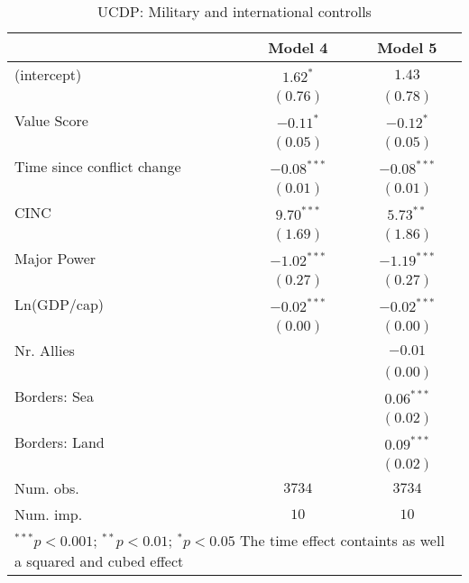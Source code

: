 
\begin{table}
\begin{center}
\begin{tabular}{l c c}
\toprule
 & Model 4 & Model 5 \\
\midrule
(intercept)                & $1.62^{*}$    & $1.43$        \\
                           & $(0.76)$      & $(0.78)$      \\
Value Score                & $-0.11^{*}$   & $-0.12^{*}$   \\
                           & $(0.05)$      & $(0.05)$      \\
Time since conflict change & $-0.08^{***}$ & $-0.08^{***}$ \\
                           & $(0.01)$      & $(0.01)$      \\
CINC                       & $9.70^{***}$  & $5.73^{**}$   \\
                           & $(1.69)$      & $(1.86)$      \\
Major Power                & $-1.02^{***}$ & $-1.19^{***}$ \\
                           & $(0.27)$      & $(0.27)$      \\
Ln(GDP/cap)                & $-0.02^{***}$ & $-0.02^{***}$ \\
                           & $(0.00)$      & $(0.00)$      \\
Nr. Allies                 &               & $-0.01$       \\
                           &               & $(0.00)$      \\
Borders: Sea               &               & $0.06^{***}$  \\
                           &               & $(0.02)$      \\
Borders: Land              &               & $0.09^{***}$  \\
                           &               & $(0.02)$      \\
\midrule
Num. obs.                  & $3734$        & $3734$        \\
Num. imp.                  & $10$          & $10$          \\
\bottomrule
\multicolumn{3}{l}{\scriptsize{$^{***}p<0.001$; $^{**}p<0.01$; $^{*}p<0.05$ 
                  The time effect containts as well a squared and cubed effect}}
\end{tabular}
\caption{UCDP: Military and international controlls}
\label{UCDP_2}
\end{center}
\end{table}
